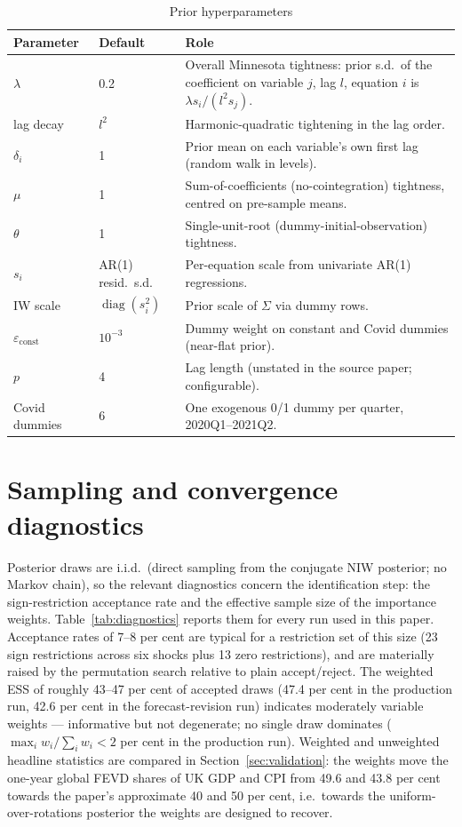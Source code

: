 \begin{table}[h]
\centering
\caption{Prior hyperparameters}
\label{tab:priors}
\small
\begin{tabular}{llp{8.3cm}}
\toprule
Parameter & Default & Role \\
\midrule
$\lambda$ & 0.2 & Overall Minnesota tightness: prior s.d.\ of the coefficient on variable $j$, lag $l$, equation $i$ is $\lambda s_i / (l^2 s_j)$. \\
lag decay & $l^2$ & Harmonic-quadratic tightening in the lag order. \\
$\delta_i$ & 1 & Prior mean on each variable's own first lag (random walk in levels). \\
$\mu$ & 1 & Sum-of-coefficients (no-cointegration) tightness, centred on pre-sample means. \\
$\theta$ & 1 & Single-unit-root (dummy-initial-observation) tightness. \\
$s_i$ & AR(1) resid.\ s.d. & Per-equation scale from univariate AR(1) regressions. \\
IW scale & $\operatorname{diag}(s_i^2)$ & Prior scale of $\Sigma$ via dummy rows. \\
$\varepsilon_{\text{const}}$ & $10^{-3}$ & Dummy weight on constant and Covid dummies (near-flat prior). \\
$p$ & 4 & Lag length (unstated in the source paper; configurable). \\
Covid dummies & 6 & One exogenous 0/1 dummy per quarter, 2020Q1--2021Q2. \\
\bottomrule
\end{tabular}
\end{table}

\section{Sampling and convergence diagnostics}
\label{app:diagnostics}

Posterior draws are i.i.d.\ (direct sampling from the conjugate NIW posterior; no Markov chain), so the relevant diagnostics concern the identification step: the sign-restriction acceptance rate and the effective sample size of the \citet{arias2018} importance weights. Table~\ref{tab:diagnostics} reports them for every run used in this paper. Acceptance rates of 7--8 per cent are typical for a restriction set of this size (23 sign restrictions across six shocks plus 13 zero restrictions), and are materially raised by the \citet{chan2025} permutation search relative to plain accept/reject. The weighted ESS of roughly 43--47 per cent of accepted draws (47.4 per cent in the production run, 42.6 per cent in the forecast-revision run) indicates moderately variable weights --- informative but not degenerate; no single draw dominates ($\max_i w_i / \sum_i w_i < 2$ per cent in the production run). Weighted and unweighted headline statistics are compared in Section~\ref{sec:validation}: the weights move the one-year global FEVD shares of UK GDP and CPI from 49.6 and 43.8 per cent towards the paper's approximate 40 and 50 per cent, i.e.\ towards the uniform-over-rotations posterior the weights are designed to recover.

